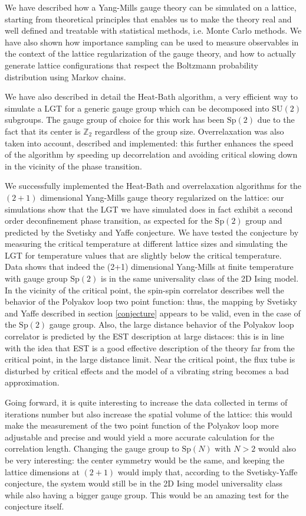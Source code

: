 \documentclass[reqno,12pt]{article}
\numberwithin{equation}{section}
\newcommand{\SU}{\mathrm{SU}}
\newcommand{\Sp}{\mathrm{Sp}}
\begin{document}
We have described how a Yang-Mills gauge theory can be simulated on a lattice, starting from theoretical principles
that enables us to make the theory real and well defined and treatable with statistical methods, i.e. Monte Carlo methods.
We have also shown how importance sampling can be used to measure observables in the context of the lattice regularization
of the gauge theory, and how to actually generate lattice configurations that respect the Boltzmann probability 
distribution using Markov chains.

We have also described in detail the Heat-Bath algorithm, a very efficient way to simulate a LGT for a generic gauge
group which can be decomposed into $\SU(2)$ subgroups. The gauge group of choice for this work has been $\Sp(2)$ due to the 
fact that its center is $\mathbb{Z}_2$ regardless of the group size. Overrelaxation was also taken into account, described
and implemented: this further enhances the speed of the algorithm by speeding up decorrelation and avoiding critical 
slowing down in the vicinity of the phase transition. 

We successfully implemented the Heat-Bath and overrelaxation algorithms for the $(2+1)$ dimensional
Yang-Mills gauge theory regularized on the lattice: our simulations show that the LGT we have simulated
does in fact exhibit a second order deconfinement phase transition, as expected for the $\Sp(2)$ group and predicted by
the Svetisky and Yaffe conjecture. We have tested the conjecture by measuring the critical temperature at different lattice
sizes and simulating the LGT for temperature values that are slightly below the critical temperature. Data shows that
indeed the (2+1) dimensional Yang-Mills at finite temperature with gauge group $\Sp(2)$ is in the same universality class
of the 2D Ising model. In the vicinity of the critical point, the spin-spin correlator describes well the behavior
of the Polyakov loop two point function: thus, the mapping by Svetisky and Yaffe described in section \ref{conjecture} appears
to be valid, even in the case of the $\Sp(2)$ gauge group. Also, the large distance behavior of the Polyakov loop correlator
is predicted by the EST description at large distaces: this is in line with the idea that EST is a good effective description
of the theory far from the critical point, in the large distance limit. Near the critical point, the flux tube
is disturbed by critical effects and the model of a vibrating string becomes a bad approximation.

Going forward, it is quite interesting to increase the data collected in terms of iterations number but also increase 
the spatial volume of the lattice: this would make the measurement of the two point function of the Polyakov loop more
adjustable and precise and would yield a more accurate calculation for the correlation length. Changing the 
gauge group to $\Sp(N)$ with $N > 2$ would also be very interesting: the center symmetry would be the same, and keeping the
lattice dimensions at $(2+1)$ would imply that, according to the Svetisky-Yaffe conjecture, the system would still
be in the 2D Ising model universality class while also having a bigger gauge group. This would be an amazing test for the
conjecture itself. 
\end{document}
